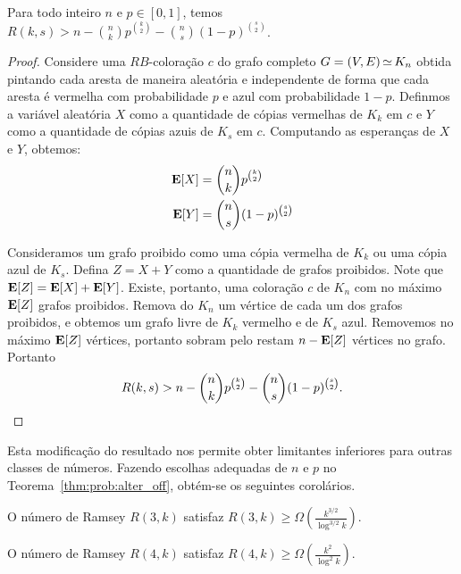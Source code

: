 \begin{theorem}
\label{thm:prob:alter_off}
Para todo inteiro $n$ e $p \in [0,1]$, temos $\displaystyle R(k, s) > n - \binom{n}{k}p^{\binom{k}{2}} - \binom{n}{s}(1-p)^{\binom{s}{2}}$.
\end{theorem}
\begin{proof}
Considere uma $RB$-coloração $c$ do grafo completo $G = (V,E) \operatorname{\simeq} K_n$ obtida pintando cada aresta de maneira aleatória e independente de forma que cada aresta é vermelha com probabilidade $p$ e azul com probabilidade $1-p$.
Definmos a variável aleatória $X$ como a quantidade de cópias vermelhas de $K_k$ em $c$ e $Y$ como a quantidade de cópias azuis de $K_s$ em $c$. Computando as esperanças de $X$ e $Y$, obtemos:
\begin{align*}
\operatorname{\mathbf{E}}[X] &= \binom{n}{k}p^{\binom{k}{2}} \\
\operatorname{\mathbf{E}}[Y] &= \binom{n}{s}(1-p)^{\binom{s}{2}}
\end{align*}

Consideramos um grafo proibido como uma cópia vermelha de $K_k$ ou uma cópia azul de $K_s$. Defina $Z = X + Y$ como a quantidade de grafos proibidos. Note que $\operatorname{\mathbf{E}}[Z] = \operatorname{\mathbf{E}}[X] + \operatorname{\mathbf{E}}[Y]$. Existe, portanto, uma coloração $c$ de $K_n$ com no máximo $\operatorname{\mathbf{E}}[Z]$ grafos proibidos. Remova do $K_n$ um vértice de cada um dos grafos proibidos, e obtemos um grafo livre de $K_k$ vermelho e de $K_s$ azul. Removemos no máximo $\operatorname{\mathbf{E}}[Z]$ vértices, portanto sobram pelo restam $n - \operatorname{\mathbf{E}}[Z] $ vértices no grafo. Portanto
\[ R(k, s) > n - \binom{n}{k}p^{\binom{k}{2}} - \binom{n}{s}(1-p)^{\binom{s}{2}}.  \qedhere\]
\end{proof}

Esta modificação do resultado nos permite obter limitantes inferiores para outras classes de números. Fazendo escolhas adequadas de $n$ e $p$ no Teorema~\ref{thm:prob:alter_off}, obtém-se os seguintes corolários.

\begin{corollary}
O número de Ramsey $R(3,k)$ satisfaz $\displaystyle R(3,k) \geq  \Omega\left( \frac{k^{3/2}}{\log^{3/2} k}\right)$.
\end{corollary}

\begin{corollary}
O número de Ramsey $R(4,k)$ satisfaz $\displaystyle R(4,k) \geq  \Omega\left( \frac{k^2}{\log^2 k}\right)$.
\end{corollary}

